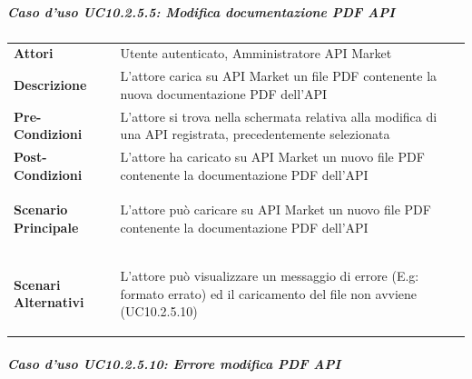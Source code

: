 \subparagraph{Caso d'uso UC10.2.5.5: Modifica documentazione PDF API}
\label{UC10_2_5_5}

\begin{minipage}{\linewidth}
	\begin{tabular}{ l | p{11cm}}
		\hline
		\rowcolor{Gray}
		\multicolumn{2}{c}{UC10.2.5.5 - Modifica documentazione PDF API} \\
		\hline
		\textbf{Attori} & Utente autenticato, Amministratore API Market \\
		\textbf{Descrizione} & L'attore carica su API Market un file PDF contenente la nuova documentazione PDF dell'API \\
		\textbf{Pre-Condizioni} & L'attore si trova nella schermata relativa alla modifica di una API registrata, precedentemente selezionata \\
		\textbf{Post-Condizioni} & L'attore ha caricato su API Market un nuovo file PDF contenente la documentazione PDF dell'API \\
		\textbf{Scenario Principale} & 
		\begin{enumerate*}[label=(\arabic*.),itemjoin={\newline}]
			\item L'attore può caricare su API Market un nuovo file PDF contenente la documentazione PDF dell'API
		\end{enumerate*}\\
		\textbf{Scenari Alternativi} & 
		\begin{enumerate*}[label=(\arabic*.),itemjoin={\newline}]
			\item L'attore può visualizzare un messaggio di errore (E.g: formato errato) ed il caricamento del file non avviene (UC10.2.5.10)
		\end{enumerate*}\\
	\end{tabular}
\end{minipage}

\subparagraph{Caso d'uso UC10.2.5.10: Errore modifica PDF API}
\label{UC10_2_5_10}

